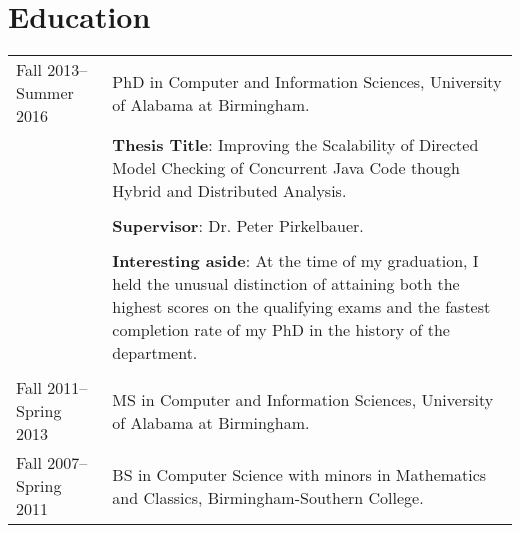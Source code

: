 \documentclass[a4paper,12pt]{article}
\begin{document}
\section{Education}
\begin{tabularx}{\linewidth}{@{}l X@{}}	
Fall 2013--Summer 2016&PhD in Computer and Information Sciences, University of Alabama at Birmingham.\\[5pt]
&\textbf{Thesis Title}: Improving the Scalability of Directed Model Checking of Concurrent Java Code though Hybrid and Distributed Analysis.\\\\
&\textbf{Supervisor}: Dr. Peter Pirkelbauer.\\\\
&\textbf{Interesting aside}: At the time of my graduation, I held the unusual distinction of attaining both the highest scores on the qualifying exams and the fastest completion rate of my PhD in the history of the department. \\\\
Fall 2011--Spring 2013&MS in Computer and Information Sciences, University of Alabama at Birmingham.\\
Fall 2007--Spring 2011&BS in Computer Science with minors in Mathematics and Classics, Birmingham-Southern College.\\
\end{tabularx}


%
\end{document}
